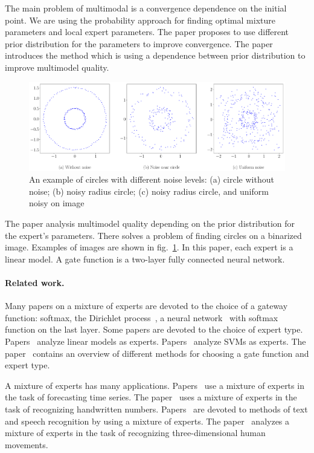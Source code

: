 \documentclass[12pt, twoside]{article}
\numberwithin{equation}{section}
\begin{document}
The main problem of multimodal is a convergence dependence on the initial point.
We are using the probability approach for finding optimal mixture parameters and local expert parameters.
The paper proposes to use different prior distribution for the parameters to improve convergence.
The paper introduces the method which is using a dependence between prior distribution to improve multimodel quality.

\begin{figure}[h!t]\center
\includegraphics[width=1\textwidth]{result_eng/statment}
\caption{An example of circles with different noise levels: (a) circle without noise; (b) noisy radius circle; (c) noisy radius circle, and uniform noisy on image}
\label{example:1}
\end{figure}

The paper analysis multimodel quality depending on the prior distribution for the expert's parameters.
There solves a problem of finding circles on a binarized image.
Examples of images are shown in fig.~\ref{example:1}.
In this paper, each expert is a linear model.
A gate function is a two-layer fully connected neural network.

\paragraph{Related work.}
Many papers on a mixture of experts are devoted to the choice of a gateway function: softmax, the Dirichlet process~\cite{Edward2002}, a neural network~\cite{Shazeer2017} with softmax function on the last layer.
Some papers are devoted to the choice of expert type. 
Papers~\cite{Jordan1994, Jordan1991} analyze linear models as experts.
Papers~\cite{Lima2007, Cao2003} analyze SVMs as experts.
The paper~\cite{Yuksel2012} contains an overview of different methods for choosing a gate function and expert type.

A mixture of experts has many applications.
Papers~\cite{Yumlu2003, Cheung1995, Weigend2000} use a mixture of experts in the task of forecasting time series.
The paper~\cite{Ebrahimpour2009} uses a mixture of experts in the task of recognizing handwritten numbers.
Papers~\cite{Estabrooks2001, Mossavat2010, Peng1996, Tuerk2001}  are devoted to methods of text and speech recognition by using a mixture of experts.
The paper~\cite{Sminchisescu2007} analyzes a mixture of experts in the task of recognizing three-dimensional human movements.
\end{document}
